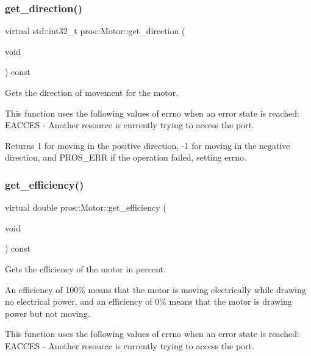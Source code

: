 \subsubsection{\texorpdfstring{get\_direction()}{get\_direction()}}
{\footnotesize\ttfamily virtual std\+::int32\+\_\+t pros\+::\+Motor\+::get\+\_\+direction (\begin{DoxyParamCaption}\item[{void}]{ }\end{DoxyParamCaption}) const\hspace{0.3cm}{\ttfamily [virtual]}}



Gets the direction of movement for the motor. 

This function uses the following values of errno when an error state is reached\+: E\+A\+C\+C\+ES -\/ Another resource is currently trying to access the port.

\begin{DoxyReturn}{Returns}
1 for moving in the positive direction, -\/1 for moving in the negative direction, and P\+R\+O\+S\+\_\+\+E\+RR if the operation failed, setting errno. 
\end{DoxyReturn}
\mbox{\label{classpros_1_1Motor_a6f0b39894abf612a1965a66224893c71}} 
\subsubsection{\texorpdfstring{get\_efficiency()}{get\_efficiency()}}
{\footnotesize\ttfamily virtual double pros\+::\+Motor\+::get\+\_\+efficiency (\begin{DoxyParamCaption}\item[{void}]{ }\end{DoxyParamCaption}) const\hspace{0.3cm}{\ttfamily [virtual]}}



Gets the efficiency of the motor in percent. 

An efficiency of 100\% means that the motor is moving electrically while drawing no electrical power, and an efficiency of 0\% means that the motor is drawing power but not moving.

This function uses the following values of errno when an error state is reached\+: E\+A\+C\+C\+ES -\/ Another resource is currently trying to access the port.

